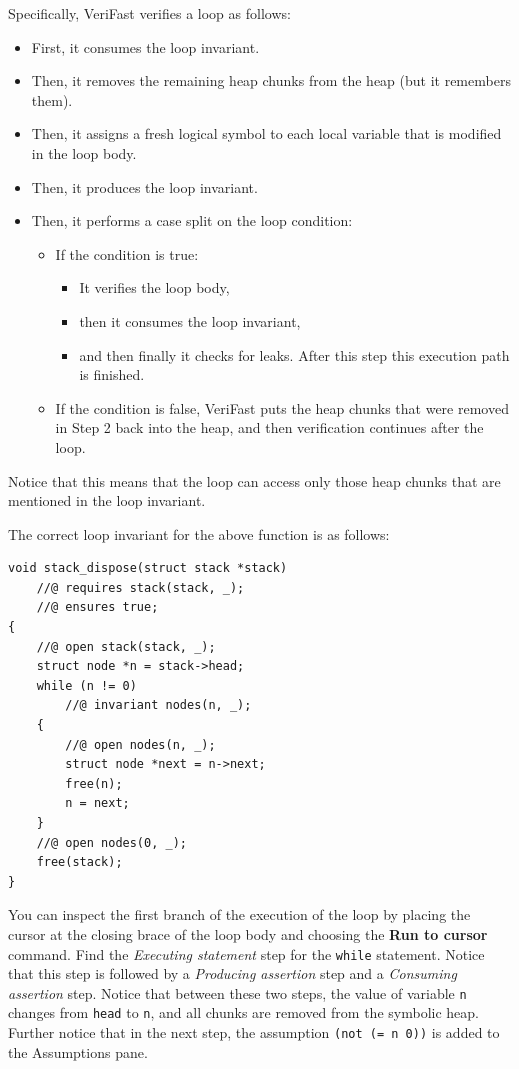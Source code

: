 \documentclass{article}
\begin{document}
Specifically, VeriFast verifies a loop as follows:
\begin{itemize}
\item First, it consumes the loop invariant.
\item Then, it removes the remaining heap chunks from the
    heap (but it remembers them).
\item Then, it assigns a fresh logical symbol to each local
    variable that is modified in the loop body.
\item Then, it produces the loop invariant.
\item Then, it performs a case split on the loop condition:
    \begin{itemize}
    \item If the condition is true:
    \begin{itemize}
    \item It verifies the loop body,
    \item then it consumes the loop invariant,
    \item and then finally it checks for leaks.
        After this step this execution path is
        finished.
    \end{itemize}
    \item If the condition is false, VeriFast puts the
        heap chunks that were removed in Step 2 back
        into the heap, and then verification continues
        after the loop.
    \end{itemize}
\end{itemize}
Notice that this means that the loop can access only those heap
chunks that are mentioned in the loop invariant.

The correct loop invariant for the above function is as
follows:
\begin{lstlisting}
void stack_dispose(struct stack *stack)
    //@ requires stack(stack, _);
    //@ ensures true;
{
    //@ open stack(stack, _);
    struct node *n = stack->head;
    while (n != 0)
        //@ invariant nodes(n, _);
    {
        //@ open nodes(n, _);
        struct node *next = n->next;
        free(n);
        n = next;
    }
    //@ open nodes(0, _);
    free(stack);
}
\end{lstlisting}

You can inspect the first branch of the execution of the loop
by placing the cursor at the closing brace of the loop body and
choosing the \textbf{Run to cursor} command. Find the
\textit{Executing statement} step for the \lstinline!while!
statement. Notice that this step is followed by a
\textit{Producing assertion} step and a \textit{Consuming
assertion} step. Notice that between these two steps, the value
of variable \lstinline!n! changes from \lstinline!head! to
\lstinline!n!, and all chunks are removed from the symbolic
heap. Further notice that in the next step, the assumption
\lstinline!(not (= n 0))! is added to the Assumptions pane.
\end{document}
